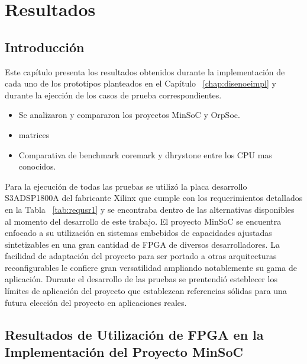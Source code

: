 \chapter{Resultados}
	\section{Introducción} 
	
	Este capítulo presenta los resultados obtenidos durante la implementación de cada uno de los prototipos planteados en el Capítulo
	~\ref{chap:disenoeimpl} y durante la ejección de los casos de prueba correspondientes. 
\begin{itemize}
\item Se analizaron y compararon los proyectos MinSoC y OrpSoc. 
\item matrices
\item Comparativa de benchmark coremark y dhrystone entre los CPU mas conocidos.		
\end{itemize}				
				
	Para la ejecución de todas las pruebas se utilizó la placa desarrollo S3ADSP1800A del fabricante Xilinx que cumple con los requerimientos detallados
	en la Tabla ~\ref{tab:requsr1} y se encontraba dentro de las alternativas disponibles al momento del desarrollo de este trabajo.
El proyecto MinSoC se encuentra enfocado a su utilización en sistemas embebidos de capacidades ajustadas sintetizables en una gran cantidad de FPGA
	de diversos desarrolladores. La facilidad de adaptación del proyecto para ser portado a otras arquitecturas reconfigurables le confiere gran
	versatilidad ampliando notablemente su gama de aplicación.
	Durante el desarrollo de las pruebas se prentendió esteblecer los límites de aplicación del proyecto que establezcan referencias sólidas para una
	futura elección del proyecto en aplicaciones reales.

	\newpage
	\section{Resultados de Utilización de FPGA en la Implementación del Proyecto MinSoC}

